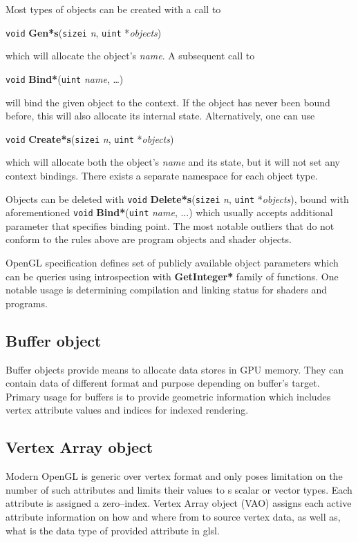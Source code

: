 \noindent Most types of objects can be created with a call to
\begin{center}
    \texttt{void} \textbf{Gen*s}(\texttt{sizei} \textit{n}, \texttt{uint} *\textit{objects})
\end{center}
\noindent which will allocate the object's \textit{name}. A subsequent call to
\begin{center}
    \texttt{void} \textbf{Bind*}(\texttt{uint} \textit{name}, \ldots)
\end{center}
\noindent will bind the given object to the context. If the object has never been bound before, this will also allocate its internal state. Alternatively, one can use
\begin{center}
    \texttt{void} \textbf{Create*s}(\texttt{sizei} \textit{n}, \texttt{uint} *\textit{objects})
\end{center}
\noindent which will allocate both the object's \textit{name} and its state, but it will not set any context bindings. There exists a separate namespace for each object type.

Objects can be deleted with \texttt{void} \textbf{Delete*s}(\texttt{sizei} \textit{n}, \texttt{uint} *\textit{objects}), bound with aforementioned \texttt{void} \textbf{Bind*}(\texttt{uint} \textit{name}, ...) which usually accepts additional parameter that specifies binding point.
The most notable outliers that do not conform to the rules above are program objects and shader objects.

OpenGL specification defines set of publicly available object parameters which can be queries using introspection with \textbf{GetInteger*} family of functions. One notable usage is determining compilation and linking status for shaders and programs. 
\subsection{Buffer object}

Buffer objects provide means to allocate data stores in GPU memory. They can contain data of different format and purpose depending on buffer's target. Primary usage for buffers is to provide geometric information which includes vertex attribute values and indices for indexed rendering.

\subsection{Vertex Array object}

Modern OpenGL is generic over vertex format and only poses limitation on the number of such 
attributes and limits their values to s scalar or vector types.
Each attribute is assigned a zero--index. Vertex Array object (VAO) assigns each active 
attribute information on how and where from to source vertex data, as well as, what is the
data type of provided attribute in glsl.

